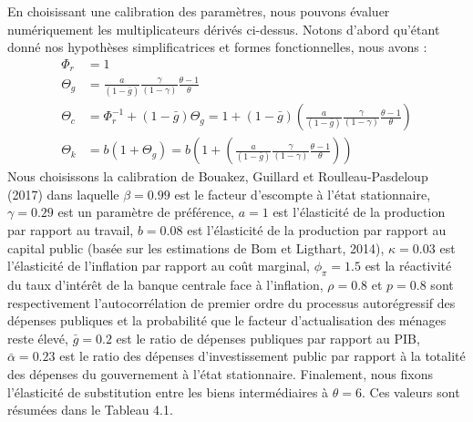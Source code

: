\documentclass[12pt,letterpaper]{article}
\newcommand{\gbar}{\bar{g}}
\newcommand{\abar}{\bar{\alpha}}
\newcommand{\Theg}{\Theta_g}
\newcommand{\Thec}{\Theta_c}
\newcommand{\Thek}{\Theta_k}
\newcommand{\Phir}{\Phi_r}
\begin{document}
En choisissant une calibration des paramètres, nous pouvons évaluer numériquement les multiplicateurs dérivés ci-dessus. Notons d’abord qu’étant donné nos hypothèses simplificatrices et formes fonctionnelles, nous avons :
\begin{align*}
\Phir &= 1\\
\Theg &= \frac{a}{(1-\gbar)}\frac{\gamma}{(1-\gamma)}\frac{\theta-1}{\theta}\\
\Thec &= \Phir^{-1} + (1-\gbar)\Theg = 1 + (1-\gbar)\left(\frac{a}{(1-\gbar)}\frac{\gamma}{(1-\gamma)}\frac{\theta-1}{\theta}\right)\\
\Thek &= b(1+\Theg) = b\left(1 + \left(\frac{a}{(1-\gbar)}\frac{\gamma}{(1-\gamma)}\frac{\theta-1}{\theta}\right)\right)
\end{align*}
Nous choisissons la calibration de Bouakez, Guillard et Roulleau-Pasdeloup (2017) dans laquelle $\beta = 0.99$ est le facteur d’escompte à l’état stationnaire, $\gamma = 0.29$ est un paramètre de préférence, $a = 1$ est l’élasticité de la production par rapport au travail, $b = 0.08$ est l’élasticité de la production par rapport au capital public (basée sur les estimations de Bom et Ligthart, 2014), $\kappa = 0.03$ est l’élasticité de l’inflation par rapport au coût marginal, $\phi_\pi = 1.5$ est la réactivité du taux d’intérêt de la banque centrale face à l’inflation, $\rho = 0.8$ et $p = 0.8$ sont respectivement l’autocorrélation de premier ordre du processus autorégressif des dépenses publiques et la probabilité que le facteur d’actualisation des ménages reste élevé, $\gbar = 0.2$ est le ratio de dépenses publiques par rapport au PIB, $\abar = 0.23$ est le ratio des dépenses d’investissement public par rapport à la totalité des dépenses du gouvernement à l’état stationnaire. Finalement, nous fixons l’élasticité de substitution entre les biens intermédiaires à $\theta = 6$. Ces valeurs sont résumées dans le Tableau 4.1.
\end{document}
